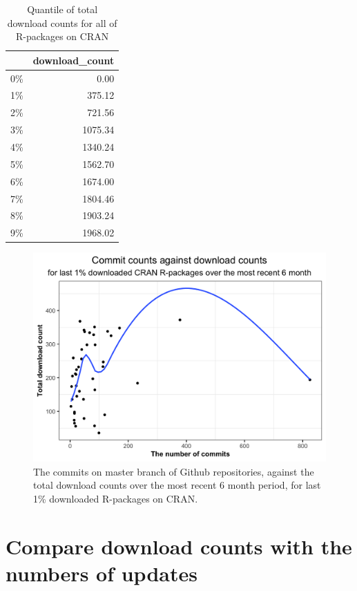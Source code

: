 \documentclass[
]{book}
\begin{document}
\begin{table}

\caption{\label{tab:quantileall}Quantile of total download counts for all of R-packages on CRAN}
\centering
\begin{tabular}[t]{l|r}
\hline
  & download\_count\\
\hline
0\% & 0.00\\
\hline
1\% & 375.12\\
\hline
2\% & 721.56\\
\hline
3\% & 1075.34\\
\hline
4\% & 1340.24\\
\hline
5\% & 1562.70\\
\hline
6\% & 1674.00\\
\hline
7\% & 1804.46\\
\hline
8\% & 1903.24\\
\hline
9\% & 1968.02\\
\hline
\end{tabular}
\end{table}



\begin{figure}

{\centering \includegraphics{figures/pkg-low-1} 

}

\caption{The commits on master branch of Github repositories, against the total download counts over the most recent 6 month period, for last 1\% downloaded R-packages on CRAN.}\label{fig:pkg-low}
\end{figure}

\hypertarget{compare-download-counts-with-the-numbers-of-updates}{%
\section{Compare download counts with the numbers of updates}\label{compare-download-counts-with-the-numbers-of-updates}}
\end{document}

